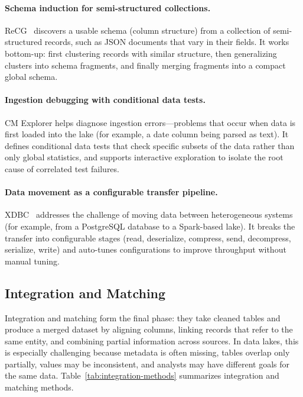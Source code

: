 \documentclass[sigconf]{acmart}
\begin{document}
\paragraph{Schema induction for semi-structured collections.}
ReCG~\cite{10.14778/3681954.3682019} discovers a usable schema (column structure) from a collection of semi-structured records, such as JSON documents that vary in their fields. It works bottom-up: first clustering records with similar structure, then generalizing clusters into schema fragments, and finally merging fragments into a compact global schema.

\paragraph{Ingestion debugging with conditional data tests.}
CM Explorer helps diagnose ingestion errors---problems that occur when data is first loaded into the lake (for example, a date column being parsed as text). It defines conditional data tests that check specific subsets of the data rather than only global statistics, and supports interactive exploration to isolate the root cause of correlated test failures.

\paragraph{Data movement as a configurable transfer pipeline.}
XDBC~\cite{10.1145/3725294} addresses the challenge of moving data between heterogeneous systems (for example, from a PostgreSQL database to a Spark-based lake). It breaks the transfer into configurable stages (read, deserialize, compress, send, decompress, serialize, write) and auto-tunes configurations to improve throughput without manual tuning.


\subsection{Integration and Matching}

Integration and matching form the final phase: they take cleaned tables and produce a merged dataset by aligning columns, linking records that refer to the same entity, and combining partial information across sources. In data lakes, this is especially challenging because metadata is often missing, tables overlap only partially, values may be inconsistent, and analysts may have different goals for the same data. Table~\ref{tab:integration-methods} summarizes integration and matching methods.
\end{document}
